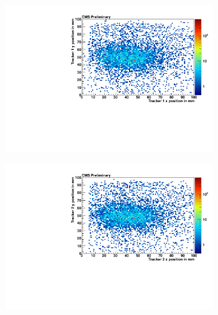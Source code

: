 \begin{figure}[!htbp]
    \centering
    \begin{subfigure}[b]{0.46\textwidth}
        \includegraphics[scale=0.35]{figures/GEM/profile_plots_for_Tracker1_Run1897.pdf}
        \caption{ }
        \label{fig:t1bp}
    \end{subfigure}
    \begin{subfigure}[b]{0.46\textwidth}
        \includegraphics[scale=0.35]{figures/GEM/profile_plots_for_Tracker2_Run1897.pdf}
        \caption{ }
        \label{fig:t2bp}
    \end{subfigure}
    \begin{subfigure}[b]{0.46\textwidth}

\end{subfigure}
\end{figure}
